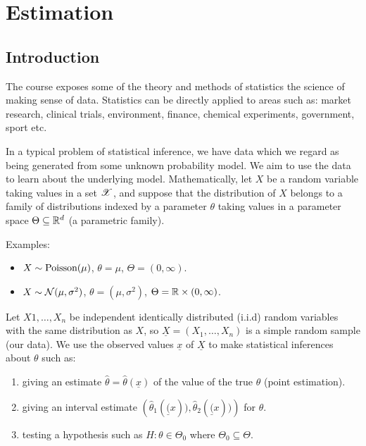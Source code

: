 
\chapter{Estimation}

\section{Introduction}
\label{sec:1.1}

The course exposes some of the theory and methods of statistics \textemdash{} the science of making sense of data. Statistics can be directly applied to areas such as: market research, clinical trials, environment, finance, chemical experiments, government, sport etc.

In a typical problem of statistical inference, we have data which we regard as being generated from some unknown probability model. We aim to use the data to learn about the underlying model. Mathematically, let $X$ be a random variable taking values in a set $\mathscr{X}$, and suppose that the distribution of $X$ belongs to a family of distributions indexed by a parameter $\theta$ taking values in a parameter space $\Theta \subseteq \mathbb{R}^d$ (a parametric family).

Examples:
\begin{itemize}
\item  $X \sim \text{Poisson} (\mu)$, $\theta = \mu$, $\Theta = (0, \infty)$.
\item $X \sim \mathcal{N}(\mu, \sigma^2)$, $\theta = (\mu, \sigma^2)$, $\Theta = \mathbb{R} \times (0, \infty)$.
\end{itemize}

Let $X1, \dotsc, X_n$  be independent identically distributed (i.i.d) random variables with the same distribution as $X$, so $\underline{X} = \left(X_1, \dotsc, X_n\right)$ is a simple random sample (our data). We use the observed values $\underline{x}$ of $\underline{X}$ to make statistical inferences about $\theta$ such as:
\begin{enumerate}
\item giving an estimate $\hat{\theta} = \hat{\theta}(\underline{x})$ of the value of the true $\theta$ (point estimation).
\item giving an interval estimate $\left(\hat{\theta}_1(\underline(x)), \hat{\theta}_2(\underline(x))\right)$ for $\theta$.
\item testing a hypothesis such as $H: \theta \in \Theta_0$ where $\Theta_0 \subseteq \Theta$.
\end{enumerate}

